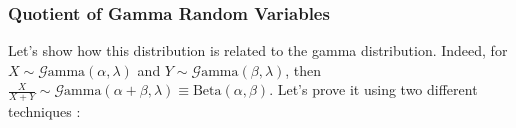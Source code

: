 \documentclass[12pt]{article}
\newcommand{\G}{\mathcal{G}}
\begin{document}

\pagebreak
\subsubsection{Quotient of Gamma Random Variables}\label{subsubsec:specialcases:beta:quotient}
Let's show how this distribution is related to the gamma distribution. Indeed, for $X\sim\G\text{amma}(\alpha, \lambda)$
and $Y\sim\G\text{amma}(\beta, \lambda)$, then
$\frac{X}{X+Y}\sim\G\text{amma}(\alpha+\beta, \lambda)\equiv\text{Beta}(\alpha, \beta)$. Let's prove it using two
different techniques \cite{ayiendaGammaRelatedDistributions2013}:
\end{document}
